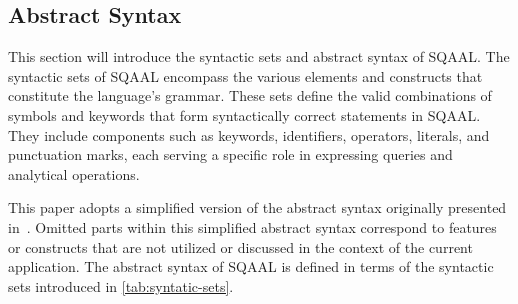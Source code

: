 \subsection{Abstract Syntax} \label{subsec:function-definitions}
This section will introduce the syntactic sets and abstract syntax of SQAAL.
The syntactic sets of SQAAL encompass the various elements and constructs that constitute the language's grammar.
These sets define the valid combinations of symbols and keywords that form syntactically correct statements in SQAAL. They include components such as keywords, identifiers, operators, literals, and punctuation marks, each serving a specific role in expressing queries and analytical operations.

This paper adopts a simplified version of the abstract syntax originally presented in~\cite{cortesi_abstract_2013}.
Omitted parts within this simplified abstract syntax correspond to features or constructs that are not utilized or discussed in the context of the current application.
The abstract syntax of SQAAL is defined in terms of the syntactic sets introduced in \autoref{tab:syntatic-sets}.
